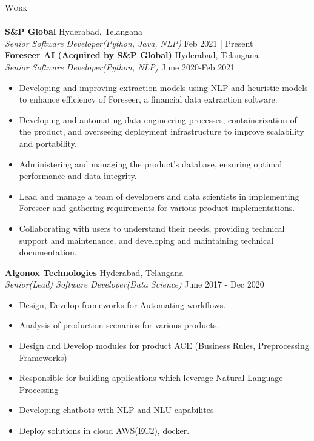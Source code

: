 \documentclass[a4paper]{article}
\newcommand{\lineunder} {
    \vspace*{-8pt} \\
    \hspace*{-18pt} \hrulefill \\
}
\newcommand{\header} [1] {
    {\hspace*{-18pt}\vspace*{6pt} \textsc{#1}}
    \vspace*{-6pt} \lineunder
}
\begin{document}
\header{Work}
\vspace{1mm}
\textbf{S\&P Global} \hfill Hyderabad, Telangana\\
\textit{Senior Software Developer(Python, Java, NLP)} \hfill  Feb 2021 | Present\\
\vspace{-1mm}
\vspace{1mm}
\textbf{Foreseer AI (Acquired by S\&P Global)} \hfill Hyderabad, Telangana\\
\textit{Senior Software Developer(Python, NLP)} \hfill June 2020-Feb 2021\\
\vspace{-1mm}
\begin{itemize} \itemsep 1pt
   \item Developing and improving extraction models using NLP and heuristic models to enhance efficiency of Foreseer, a financial data extraction software.
\item Developing and automating data engineering processes, containerization of the product, and overseeing deployment infrastructure to improve scalability and portability.
\item Administering and managing the product's database, ensuring optimal performance and data integrity.
\item Lead and manage a team of developers and data scientists in implementing Foreseer and gathering requirements for various product implementations.
\item Collaborating with users to understand their needs, providing technical support and maintenance, and developing and maintaining technical documentation.
\end{itemize}
\vspace{1mm}
\textbf{Algonox Technologies} \hfill Hyderabad, Telangana\\
\textit{Senior(Lead) Software Developer(Data Science)} \hfill June 2017 - Dec 2020\\
\vspace{-1mm}
\begin{itemize} \itemsep 1pt
    \item Design, Develop frameworks for Automating workflows.
    \item Analysis of production scenarios for various products.
	\item Design and Develop modules for product ACE (Business Rules, Preprocessing Frameworks)
	\item Responsible for building applications which leverage Natural Language Processing
    \item Developing chatbots with NLP and NLU capabilites
    \item Deploy solutions in cloud AWS(EC2), docker.
\end{itemize}
\vspace{2mm}
\end{document}
